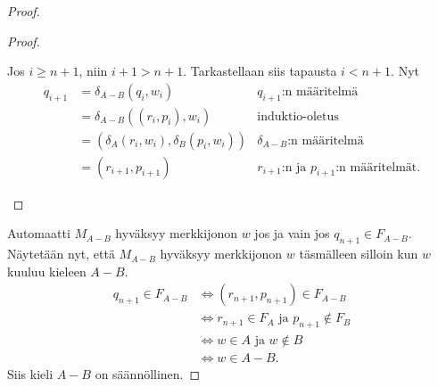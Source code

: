 \documentclass[a4paper,11pt,draft]{article}
\begin{document}
\begin{enumerate}
\begin{proof}
\begin{proof}
\begin{description}
\begin{description}
            Jos $i \ge n+1$, niin $i+1 > n+1$. Tarkastellaan siis tapausta
            $i < n+1$. Nyt
%
            \begin{align*}
              q_{i+1} &= \delta_{A-B}(q_i, w_i)
                         &\text{$q_{i+1}$:n määritelmä}\\
                      &= \delta_{A-B}((r_i, p_i), w_i)
                         &\text{induktio-oletus} \\
                      &= (\delta_A(r_i, w_i), \delta_B(p_i, w_i))
                         &\text{$\delta_{A-B}$:n määritelmä}\\
                      &= (r_{i+1}, p_{i+1})
                         &\text{$r_{i+1}$:n ja $p_{i+1}$:n määritelmät.}
            \end{align*}
          \end{description}
      \end{description}
    \end{proof}
%

    Automaatti $M_{A-B}$ hyväksyy merkkijonon $w$ jos ja vain jos
    $q_{n+1} \in F_{A-B}$. Näytetään nyt, että $M_{A-B}$ hyväksyy merkkijonon
    $w$ täsmälleen silloin kun $w$ kuuluu kieleen $A -B$.
%
    \begin{align*}
      q_{n+1} \in F_{A-B}
      &\Leftrightarrow (r_{n+1}, p_{n+1}) \in F_{A-B} \\
      &\Leftrightarrow r_{n+1} \in F_A \text{ ja } p_{n+1} \notin F_B \\
      &\Leftrightarrow w \in A \text{ ja } w \notin B \\
      &\Leftrightarrow w \in A - B.
    \end{align*}
%
    Siis kieli $A - B$ on säännöllinen.
  \end{proof}

\end{enumerate}
\end{document}
